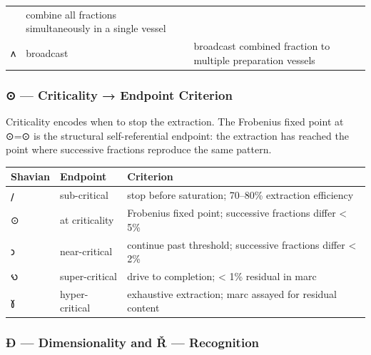 \begin{longtable}[]{@{}lll@{}}
\begin{minipage}[t]{0.30\columnwidth}
\end{minipage} & \begin{minipage}[t]{0.30\columnwidth}\raggedright
combine all fractions simultaneously in a single vessel\strut
\end{minipage}\tabularnewline
\begin{minipage}[t]{0.30\columnwidth}\raggedright
𐑵\strut
\end{minipage} & \begin{minipage}[t]{0.30\columnwidth}\raggedright
broadcast\strut
\end{minipage} & \begin{minipage}[t]{0.30\columnwidth}\raggedright
broadcast combined fraction to multiple preparation vessels\strut
\end{minipage}\tabularnewline
\bottomrule
\end{longtable}

\hypertarget{criticality-endpoint-criterion}{%
\subsubsection{⊙ --- Criticality → Endpoint
Criterion}\label{criticality-endpoint-criterion}}

Criticality encodes when to stop the extraction. The Frobenius fixed
point at ⊙=⊙ is the structural self-referential endpoint: the extraction
has reached the point where successive fractions reproduce the same
pattern.

\begin{longtable}[]{@{}lll@{}}
\toprule
Shavian & Endpoint & Criterion\tabularnewline
\midrule
\endhead
𐑢 & sub-critical & stop before saturation; 70--80\% extraction
efficiency\tabularnewline
⊙ & at criticality & Frobenius fixed point; successive fractions differ
\textless{} 5\%\tabularnewline
𐑮 & near-critical & continue past threshold; successive fractions differ
\textless{} 2\%\tabularnewline
𐑻 & super-critical & drive to completion; \textless{} 1\% residual in
marc\tabularnewline
𐑣 & hyper-critical & exhaustive extraction; marc assayed for residual
content\tabularnewline
\bottomrule
\end{longtable}

\hypertarget{uxf0-dimensionality-and-ux159-recognition}{%
\subsubsection{Ð --- Dimensionality and Ř ---
Recognition}\label{uxf0-dimensionality-and-ux159-recognition}}

